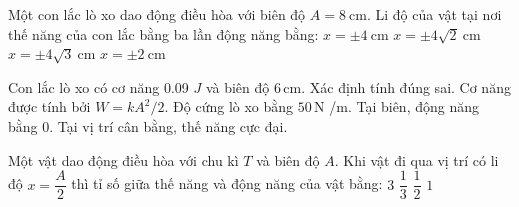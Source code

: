 \begin{ex}
Một con lắc lò xo dao động điều hòa với biên độ $A = 8\ \mathrm{cm}$. Li độ của vật tại nơi thế năng của con lắc bằng ba lần động năng bằng:
\choice
{$x = \pm 4\ \mathrm{cm}$}
{$x = \pm 4\sqrt{2}\ \mathrm{cm}$}
{\True $x = \pm 4\sqrt{3}\ \mathrm{cm}$}
{$x = \pm 2\ \mathrm{cm}$}
\end{ex}

\begin{ex}
Con lắc lò xo có cơ năng 0.09 $J$ và biên độ $6\,\text{cm}$. Xác định tính đúng sai.
\choiceTF
{\True Cơ năng được tính bởi $W=kA^2/2$.}
{\True Độ cứng lò xo bằng $50\,\text{N}$ /m.}
{\True Tại biên, động năng bằng 0.}
{Tại vị trí cân bằng, thế năng cực đại.}
\end{ex}

\begin{ex}
Một vật dao động điều hòa với chu kì $T$ và biên độ $A$. Khi vật đi qua vị trí có li độ $x = \dfrac{A}{2}$ thì tỉ số giữa thế năng và động năng của vật bằng:
\choice
{$3$}
{\True $\dfrac{1}{3}$}
{$\dfrac{1}{2}$}
{$1$}
\end{ex}

